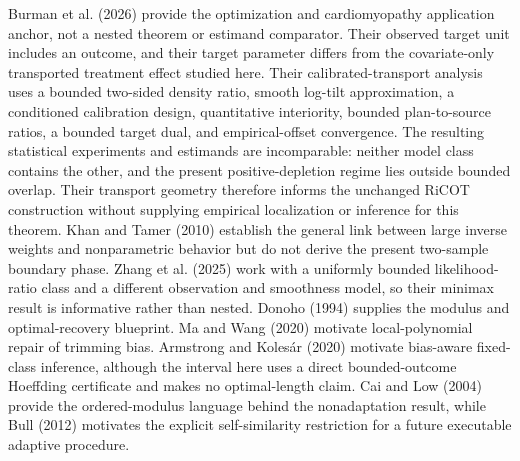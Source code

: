 Burman et al. (2026) provide the optimization and cardiomyopathy application anchor, not a nested theorem or estimand comparator. Their observed target unit includes an outcome, and their target parameter differs from the covariate-only transported treatment effect studied here. Their calibrated-transport analysis uses a bounded two-sided density ratio, smooth log-tilt approximation, a conditioned calibration design, quantitative interiority, bounded plan-to-source ratios, a bounded target dual, and empirical-offset convergence. The resulting statistical experiments and estimands are incomparable: neither model class contains the other, and the present positive-depletion regime lies outside bounded overlap. Their transport geometry therefore informs the unchanged RiCOT construction without supplying empirical localization or inference for this theorem. Khan and Tamer (2010) establish the general link between large inverse weights and nonparametric behavior but do not derive the present two-sample boundary phase. Zhang et al. (2025) work with a uniformly bounded likelihood-ratio class and a different observation and smoothness model, so their minimax result is informative rather than nested. Donoho (1994) supplies the modulus and optimal-recovery blueprint. Ma and Wang (2020) motivate local-polynomial repair of trimming bias. Armstrong and Kolesár (2020) motivate bias-aware fixed-class inference, although the interval here uses a direct bounded-outcome Hoeffding certificate and makes no optimal-length claim. Cai and Low (2004) provide the ordered-modulus language behind the nonadaptation result, while Bull (2012) motivates the explicit self-similarity restriction for a future executable adaptive procedure.